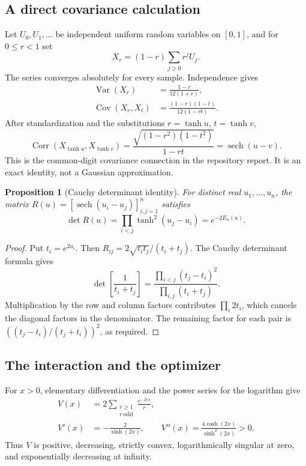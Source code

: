 \documentclass[11pt,a4paper]{article}
\newtheorem{proposition}[theorem]{Proposition}
\theoremstyle{definition}
\theoremstyle{remark}
\newcommand{\sech}{\operatorname{sech}}
\begin{document}
\subsection{A direct covariance calculation}
Let $U_0,U_1,\ldots$ be independent uniform random variables on $[0,1]$, and
for $0\le r<1$ set
\begin{equation}
 X_r=(1-r)\sum_{j\ge0}r^jU_j.
 \label{eq:Xr}
\end{equation}
The series converges absolutely for every sample. Independence gives
\begin{align}
 \operatorname{Var}(X_r)&=\frac{1-r}{12(1+r)},\label{eq:variance}\\
 \operatorname{Cov}(X_r,X_t)&=\frac{(1-r)(1-t)}{12(1-rt)}.
 \label{eq:cov}
\end{align}
After standardization and the substitutions $r=\tanh u$, $t=\tanh v$,
\begin{equation}
 \operatorname{Corr}(X_{\tanh u},X_{\tanh v})
 =\frac{\sqrt{(1-r^2)(1-t^2)}}{1-rt}=\sech(u-v).
 \label{eq:sech-cov}
\end{equation}
This is the common-digit covariance connection in the repository report.
It is an exact identity, not a Gaussian approximation.

\begin{proposition}[Cauchy determinant identity]
\label{prop:det}
For distinct real $u_1,\ldots,u_n$, the matrix
$R(u)=[\sech(u_i-u_j)]_{i,j=1}^n$ satisfies
\begin{equation}
 \det R(u)=\prod_{i<j}\tanh^2(u_j-u_i)=e^{-2E_n(u)}.
 \label{eq:detidentity}
\end{equation}
\end{proposition}
\begin{proof}
Put $t_i=e^{2u_i}$. Then
$R_{ij}=2\sqrt{t_it_j}/(t_i+t_j)$. The Cauchy determinant formula gives
\[
 \det\left[\frac1{t_i+t_j}\right]
 =\frac{\prod_{i<j}(t_j-t_i)^2}{\prod_{i,j}(t_i+t_j)}.
\]
Multiplication by the row and column factors contributes $\prod_i2t_i$,
which cancels the diagonal factors in the denominator. The remaining
factor for each pair is $((t_j-t_i)/(t_j+t_i))^2$, as required.
\end{proof}

\subsection{The interaction and the optimizer}
For $x>0$, elementary differentiation and the power series for the logarithm
give
\begin{align}
 V(x)&=2\sum_{\substack{r\ge1\\r\ \mathrm{odd}}}\frac{e^{-2rx}}r,
 \label{eq:Vseries}\\
 V'(x)&=-\frac2{\sinh(2x)},\qquad
 V''(x)=\frac{4\cosh(2x)}{\sinh^2(2x)}>0.
 \label{eq:Vderiv}
\end{align}
Thus $V$ is positive, decreasing, strictly convex, logarithmically singular
at zero, and exponentially decreasing at infinity.
\end{document}
